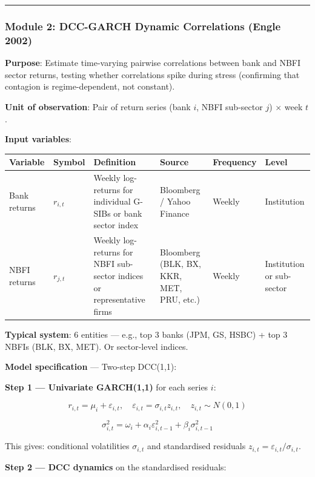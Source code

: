 \documentclass[11pt,a4paper]{article}
\begin{document}
\bigskip\noindent\rule{\textwidth}{0.4pt}\bigskip


\subsubsection{Module 2: DCC-GARCH Dynamic Correlations (Engle 2002)}

\textbf{Purpose}: Estimate time-varying pairwise correlations between bank and NBFI sector returns, testing whether correlations spike during stress (confirming that contagion is regime-dependent, not constant).

\textbf{Unit of observation}: Pair of return series (bank $i$, NBFI sub-sector $j$) $\times$ week $t$.

\textbf{Input variables}:


{\small
\begin{longtable}{|p{}|p{}|p{}|p{}|p{}|p{}|}
\hline
\textbf{Variable} & \textbf{Symbol} & \textbf{Definition} & \textbf{Source} & \textbf{Frequency} & \textbf{Level} \\
\hline
\endhead
Bank returns & $r_{i,t}$ & Weekly log-returns for individual G-SIBs or bank sector index & Bloomberg / Yahoo Finance & Weekly & Institution \\
\hline
NBFI returns & $r_{j,t}$ & Weekly log-returns for NBFI sub-sector indices or representative firms & Bloomberg (BLK, BX, KKR, MET, PRU, etc.) & Weekly & Institution or sub-sector \\
\hline
\end{longtable}
}

\textbf{Typical system}: 6 entities --- e.g., top 3 banks (JPM, GS, HSBC) + top 3 NBFIs (BLK, BX, MET). Or sector-level indices.

\textbf{Model specification} --- Two-step DCC(1,1):

\textbf{Step 1 --- Univariate GARCH(1,1)} for each series $i$:

\[r_{i,t} = \mu_i + \varepsilon_{i,t}, \quad \varepsilon_{i,t} = \sigma_{i,t} z_{i,t}, \quad z_{i,t} \sim N(0,1)\]

\[\sigma_{i,t}^2 = \omega_i + \alpha_i \varepsilon_{i,t-1}^2 + \beta_i \sigma_{i,t-1}^2\]

This gives: conditional volatilities $\sigma_{i,t}$ and standardised residuals $z_{i,t} = \varepsilon_{i,t}/\sigma_{i,t}$.

\textbf{Step 2 --- DCC dynamics} on the standardised residuals:
\end{document}
